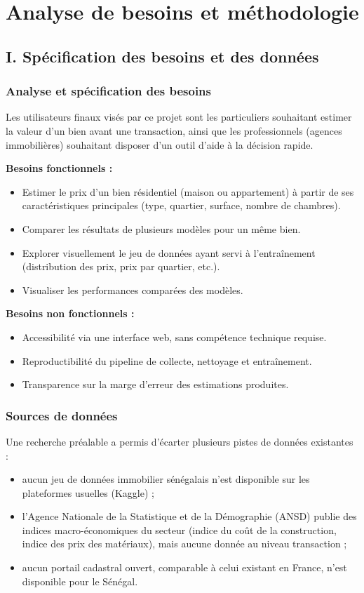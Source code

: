 \chapter{Analyse de besoins et méthodologie}

\section{I. Spécification des besoins et des données}

\subsection{Analyse et spécification des besoins}

Les utilisateurs finaux visés par ce projet sont les particuliers souhaitant estimer la valeur
d'un bien avant une transaction, ainsi que les professionnels (agences immobilières) souhaitant
disposer d'un outil d'aide à la décision rapide.

\textbf{Besoins fonctionnels :}
\begin{itemize}
  \item Estimer le prix d'un bien résidentiel (maison ou appartement) à partir de ses
  caractéristiques principales (type, quartier, surface, nombre de chambres).
  \item Comparer les résultats de plusieurs modèles pour un même bien.
  \item Explorer visuellement le jeu de données ayant servi à l'entraînement (distribution des
  prix, prix par quartier, etc.).
  \item Visualiser les performances comparées des modèles.
\end{itemize}

\textbf{Besoins non fonctionnels :}
\begin{itemize}
  \item Accessibilité via une interface web, sans compétence technique requise.
  \item Reproductibilité du pipeline de collecte, nettoyage et entraînement.
  \item Transparence sur la marge d'erreur des estimations produites.
\end{itemize}

\subsection{Sources de données}

Une recherche préalable a permis d'écarter plusieurs pistes de données existantes :
\begin{itemize}
  \item aucun jeu de données immobilier sénégalais n'est disponible sur les plateformes usuelles
  (Kaggle) ;
  \item l'Agence Nationale de la Statistique et de la Démographie (ANSD) publie des indices
  macro-économiques du secteur (indice du coût de la construction, indice des prix des
  matériaux), mais aucune donnée au niveau transaction ;
  \item aucun portail cadastral ouvert, comparable à celui existant en France, n'est disponible
  pour le Sénégal.
\end{itemize}

